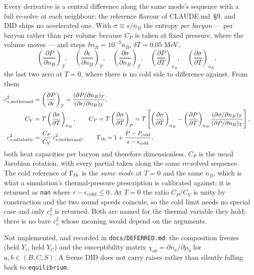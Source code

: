 \documentclass[aps,prc,onecolumn,superscriptaddress,nofootinbib,10pt]{revtex4-2}
\newcommand{\nB}{n_B}
\begin{document}
Every derivative is a central difference along the same mode's sequence with a
full re-solve at each neighbour: the reference flavour of CLAUDE.md~\S9, and
DID ships no accelerated one. With $\sigma \equiv s/\nB$ the entropy
\emph{per baryon} --- per baryon rather than per volume because $C_P$ is taken
at fixed pressure, where the volume moves --- and steps
$\delta \nB = 10^{-3}\nB$, $\delta T = 0.05$ MeV,
\begin{equation}
  \left(\frac{\partial P}{\partial \nB}\right)_T ,\quad
  \left(\frac{\partial \epsilon}{\partial \nB}\right)_T ,\quad
  \left(\frac{\partial \sigma}{\partial \nB}\right)_T ,\quad
  \left(\frac{\partial P}{\partial T}\right)_{\nB} ,\quad
  \left(\frac{\partial \sigma}{\partial T}\right)_{\nB} ,
\end{equation}
the last two zero at $T = 0$, where there is no cold side to difference
against. From them
\begin{align}
  c^2_{s,\rm isothermal} &= \left(\frac{\partial P}{\partial\epsilon}\right)_T
    = \frac{(\partial P/\partial \nB)_T}{(\partial\epsilon/\partial \nB)_T} ,
  \label{eq:cs2iso} \\
  C_V &= T\left(\frac{\partial\sigma}{\partial T}\right)_{\nB} ,
  \qquad
  C_P = T\left(\frac{\partial\sigma}{\partial T}\right)_{P}
      = T\left[\left(\frac{\partial\sigma}{\partial T}\right)_{\nB}
        - \left(\frac{\partial P}{\partial T}\right)_{\nB}
          \frac{(\partial\sigma/\partial \nB)_T}{(\partial P/\partial \nB)_T}
        \right] ,
  \label{eq:CVCP} \\
  c^2_{s,\rm adiabatic} &= \frac{C_P}{C_V}\, c^2_{s,\rm isothermal} ,
  \qquad
  \Gamma_{\rm th} = 1 + \frac{P - P_{\rm cold}}{\epsilon - \epsilon_{\rm cold}} ,
  \label{eq:cs2ad}
\end{align}
both heat capacities per baryon and therefore dimensionless. $C_P$ is the usual
Jacobian rotation, with every partial taken along the same re-solved sequence.
The cold reference of $\Gamma_{\rm th}$ is the \emph{same mode} at $T = 0$ and
the same $\nB$, which is what a simulation's thermal-pressure prescription is
calibrated against; it is returned as \texttt{nan} where
$\epsilon - \epsilon_{\rm cold} \le 0$. At $T = 0$ the ratio $C_P/C_V$ is unity
by construction and the two sound speeds coincide, so the cold limit needs no
special case and only $c^2_s$ is returned. Both are named for the thermal
variable they hold: there is no bare $c_s^2$ whose meaning would depend on the
arguments.

Not implemented, and recorded in \texttt{docs/DEFERRED.md}: the composition
freezes (held $Y_i$, held $Y_C$) and the susceptibility matrix
$\chi_{ab} = \partial n_a/\partial\mu_b$ for $a,b \in (B, C, S)$. A freeze DID
does not carry raises rather than silently falling back to
\texttt{equilibrium}.
\end{document}
